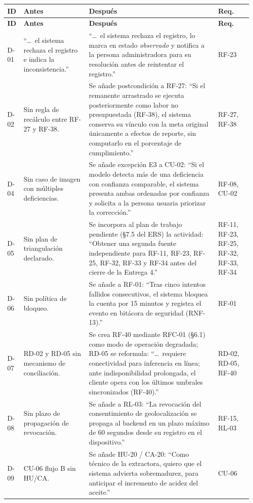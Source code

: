 \documentclass[11pt,a4paper]{article}
\begin{document}
\begin{longtable}{p{0.7cm}p{5.3cm}p{5.3cm}p{1.5cm}}
\toprule
\textbf{ID} & \textbf{Antes} & \textbf{Después} & \textbf{Req.} \\
\midrule
\endfirsthead
\toprule
\textbf{ID} & \textbf{Antes} & \textbf{Después} & \textbf{Req.} \\
\midrule
\endhead
D-01 & ``\dots\ el sistema rechaza el registro e indica la inconsistencia.'' & ``\dots\ el sistema rechaza el registro, lo marca en estado \emph{observado} y notifica a la persona administradora para su resolución antes de reintentar el registro.'' & RF-23 \\
D-02 & Sin regla de recálculo entre RF-27 y RF-38. & Se añade postcondición a RF-27: ``Si el remanente arrastrado se ejecuta posteriormente como labor no presupuestada (RF-38), el sistema conserva su vínculo con la meta original únicamente a efectos de reporte, sin computarlo en el porcentaje de cumplimiento.'' & RF-27, RF-38 \\
D-04 & Sin caso de imagen con múltiples deficiencias. & Se añade excepción E3 a CU-02: ``Si el modelo detecta más de una deficiencia con confianza comparable, el sistema presenta ambas ordenadas por confianza y solicita a la persona usuaria priorizar la corrección.'' & RF-08, CU-02 \\
D-05 & Sin plan de triangulación declarado. & Se incorpora al plan de trabajo pendiente (\S7.5 del ERS) la actividad: ``Obtener una segunda fuente independiente para RF-11, RF-23, RF-25, RF-32, RF-33 y RF-34 antes del cierre de la Entrega 4.'' & RF-11, RF-23, RF-25, RF-32, RF-33, RF-34 \\
D-06 & Sin política de bloqueo. & Se añade a RF-01: ``Tras cinco intentos fallidos consecutivos, el sistema bloquea la cuenta por 15 minutos y registra el evento en bitácora de seguridad (RNF-13).'' & RF-01 \\
D-07 & RD-02 y RD-05 sin mecanismo de conciliación. & Se crea RF-40 mediante RFC-01 (\S6.1) como modo de operación degradada; RD-05 se reformula: ``\dots\ requiere conectividad para inferencia en línea; ante indisponibilidad prolongada, el cliente opera con los últimos umbrales sincronizados (RF-40).'' & RD-02, RD-05, RF-40 \\
D-08 & Sin plazo de propagación de revocación. & Se añade a RL-03: ``La revocación del consentimiento de geolocalización se propaga al backend en un plazo máximo de 60 segundos desde su registro en el dispositivo.'' & RF-15, RL-03 \\
D-09 & CU-06 flujo B sin HU/CA. & Se añade HU-20 / CA-20: ``Como técnico de la extractora, quiero que el sistema advierta sobremadurez, para anticipar el incremento de acidez del aceite.'' & CU-06 \\

\end{longtable}
\end{document}
